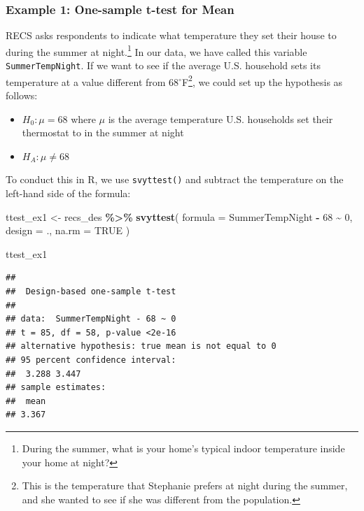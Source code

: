 \documentclass[
]{krantz}
\makeatletter
\newenvironment{Shaded}{\begin{snugshade}}{\end{snugshade}}
\newcommand{\AttributeTok}[1]{\textcolor[rgb]{0.27,0.27,0.27}{#1}}
\newcommand{\ConstantTok}[1]{\textcolor[rgb]{0.37,0.37,0.37}{#1}}
\newcommand{\DecValTok}[1]{\textcolor[rgb]{0.06,0.06,0.06}{#1}}
\newcommand{\FunctionTok}[1]{\textcolor[rgb]{0.27,0.27,0.27}{\textbf{#1}}}
\newcommand{\NormalTok}[1]{#1}
\newcommand{\OtherTok}[1]{\textcolor[rgb]{0.37,0.37,0.37}{#1}}
\newcommand{\SpecialCharTok}[1]{\textcolor[rgb]{0.43,0.43,0.43}{\textbf{#1}}}
\providecommand{\tightlist}{%
  \setlength{\itemsep}{0pt}\setlength{\parskip}{0pt}}
\newenvironment{kframe}{%
\medskip{}
\setlength{\fboxsep}{.8em}
 \def\at@end@of@kframe{}%
 \ifinner\ifhmode%
  \def\at@end@of@kframe{\end{minipage}}%
  \begin{minipage}{\columnwidth}%
 \fi\fi%
 \def\FrameCommand##1{\hskip\@totalleftmargin \hskip-\fboxsep
 \colorbox{shadecolor}{##1}\hskip-\fboxsep
     \hskip-\linewidth \hskip-\@totalleftmargin \hskip\columnwidth}%
 \MakeFramed {\advance\hsize-\width
   \@totalleftmargin\z@ \linewidth\hsize
   \@setminipage}}%
 {\par\unskip\endMakeFramed%
 \at@end@of@kframe}
\renewenvironment{Shaded}{\begin{kframe}}{\end{kframe}}
\makeatother
\begin{document}
\hypertarget{stattest-ttest-ex1}{%
\subsubsection*{Example 1: One-sample t-test for Mean}\label{stattest-ttest-ex1}}


RECS asks respondents to indicate what temperature they set their house to during the summer at night.\footnote{During the summer, what is your home's typical indoor temperature inside your home at night?} In our data, we have called this variable \texttt{SummerTempNight}. If we want to see if the average U.S. household sets its temperature at a value different from 68\(^\circ\)F\footnote{This is the temperature that Stephanie prefers at night during the summer, and she wanted to see if she was different from the population.}, we could set up the hypothesis as follows:

\begin{itemize}
\tightlist
\item
  \(H_0: \mu = 68\) where \(\mu\) is the average temperature U.S. households set their thermostat to in the summer at night
\item
  \(H_A: \mu \neq 68\)
\end{itemize}

To conduct this in R, we use \texttt{svyttest()} and subtract the temperature on the left-hand side of the formula:

\begin{Shaded}
\begin{Highlighting}[]
\NormalTok{ttest\_ex1 }\OtherTok{\textless{}{-}}\NormalTok{ recs\_des }\SpecialCharTok{\%\textgreater{}\%}
  \FunctionTok{svyttest}\NormalTok{(}
    \AttributeTok{formula =}\NormalTok{ SummerTempNight }\SpecialCharTok{{-}} \DecValTok{68} \SpecialCharTok{\textasciitilde{}} \DecValTok{0}\NormalTok{,}
    \AttributeTok{design =}\NormalTok{ .,}
    \AttributeTok{na.rm =} \ConstantTok{TRUE}
\NormalTok{  )}

\NormalTok{ttest\_ex1}
\end{Highlighting}
\end{Shaded}

\begin{verbatim}
## 
##  Design-based one-sample t-test
## 
## data:  SummerTempNight - 68 ~ 0
## t = 85, df = 58, p-value <2e-16
## alternative hypothesis: true mean is not equal to 0
## 95 percent confidence interval:
##  3.288 3.447
## sample estimates:
##  mean 
## 3.367
\end{verbatim}
\end{document}
